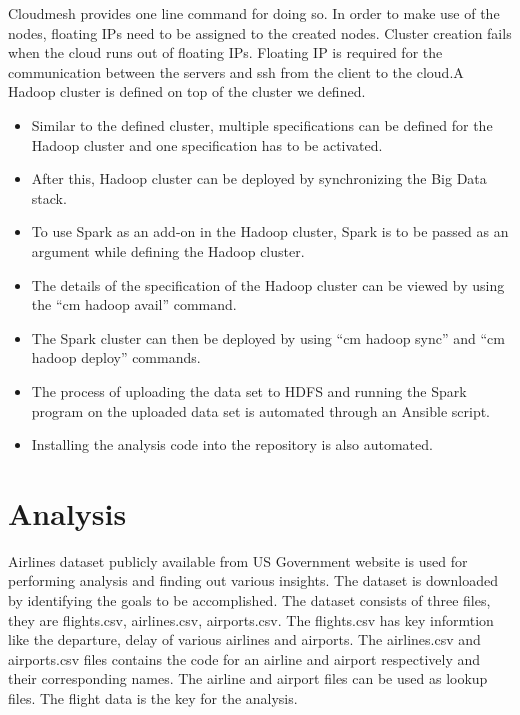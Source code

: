 \documentclass[9pt,twocolumn,twoside]{../../styles/osajnl}
\begin{document}
Cloudmesh provides one line command for doing so. In order to make use
of the nodes, floating IPs need to be assigned to the created
nodes. Cluster creation fails when the cloud runs out of floating
IPs. Floating IP is required for the communication between the servers
and ssh from the client to the cloud.A Hadoop cluster is defined on
top of the cluster we defined.

\begin{itemize}
  
\item Similar to the defined cluster, multiple specifications can be
  defined for the Hadoop cluster and one specification has to be
  activated.

\item After this, Hadoop cluster can be deployed by synchronizing the
  Big Data stack.

\item To use Spark as an add-on in the Hadoop cluster, Spark is to be
  passed as an argument while defining the Hadoop cluster.

\item The details of the specification of the Hadoop cluster can be
  viewed by using the “cm hadoop avail” command.

\item The Spark cluster can then be deployed by using “cm hadoop sync”
  and “cm hadoop deploy” commands.

\item The process of uploading the data set to HDFS and running the
  Spark program on the uploaded data set is automated through an
  Ansible script.

\item Installing the analysis code into the repository is also automated.
\end{itemize}

\section{Analysis}

Airlines dataset publicly available from US Government website is used
for performing analysis and finding out various insights. The dataset
is downloaded by identifying the goals to be accomplished. The dataset
consists of three files, they are flights.csv, airlines.csv,
airports.csv.  The flights.csv has key informtion like the departure,
delay of various airlines and airports. The airlines.csv and
airports.csv files contains the code for an airline and airport
respectively and their corresponding names.  The airline and airport
files can be used as lookup files. The flight data is the key for the analysis.
\end{document}
